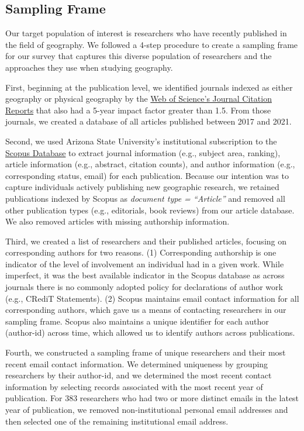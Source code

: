 \documentclass[]{interact}
\theoremstyle{plain}%
\theoremstyle{definition}
\theoremstyle{remark}
\begin{document}
\subsection*{Sampling Frame}
Our target population of interest is researchers who have recently published in the field of geography. 
We followed a 4-step procedure to create a sampling frame for our survey that captures this diverse population of researchers and the approaches they use when studying geography. 

First, beginning at the publication level, we identified journals indexed as either geography or physical geography by the \href{https://access.clarivate.com/}{Web of Science's Journal Citation Reports} that also had a 5-year impact factor greater than 1.5.
From those journals, we created a database of all articles published between 2017 and 2021.  

Second, we used Arizona State University's institutional subscription to the \href{https://www.scopus.com/home.uri}{Scopus Database} to extract journal information (e.g., subject area, ranking), article information (e.g., abstract, citation counts), and author information (e.g., corresponding status, email) for each publication. 
Because our intention was to capture individuals actively publishing new geographic research, we retained publications indexed by Scopus as \textit{document type = ``Article''} and removed all other publication types (e.g., editorials, book reviews) from our article database. 
We also removed articles with missing authorship information. 

Third, we created a list of researchers and their published articles, focusing on corresponding authors for two reasons.
(1) Corresponding authorship is one indicator of the level of involvement an individual had in a given work. 
While imperfect, it was the best available indicator in the Scopus database as across journals there is no commonly adopted policy for declarations of author work (e.g., CRediT Statements).
(2) Scopus maintains email contact information for all corresponding authors, which gave us a means of contacting researchers in our sampling frame.
Scopus also maintains a unique identifier for each author (author-id) across time, which allowed us to identify authors across publications. 

Fourth, we constructed a sampling frame of unique researchers and their most recent email contact information. 
We determined uniqueness by grouping researchers by their author-id, and we determined the most recent contact information by selecting records associated with the most recent year of publication. 
For 383 researchers who had two or more distinct emails in the latest year of publication, we removed non-institutional personal email addresses and then selected one of the remaining institutional email address.
\end{document}
